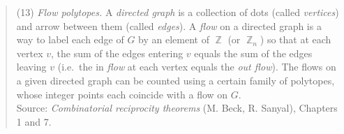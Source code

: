 \documentclass{amsart}
\DeclareMathOperator{\Z}{\mathbb{Z}}
\theoremstyle{plain}
\theoremstyle{remark}
\theoremstyle{definition}
\begin{document}
%
%
%

\noindent
\begin{quote}
  (13) \emph{Flow polytopes.}
  A \emph{directed graph} is a collection of dots (called \emph{vertices}) and
  arrow between them (called \emph{edges}). A \emph{flow} on a directed graph is a
  way to label each edge of $G$ by an element of $\Z$ (or $\Z_n$) so that at each
  vertex $v$, the sum of the edges entering $v$ equals the sum of the edges
  leaving $v$ (i.e.\ the in \emph{flow} at each vertex equals the \emph{out
  flow}). The flows on a given directed graph can be counted using a certain
  family of polytopes, whose integer points each coincide with a flow on $G$.
  \\[1em]
  \noindent
  Source:
  \emph{Combinatorial reciprocity theorems} (M. Beck, R. Sanyal), Chapters 1 and 7.
\end{quote}

\hrulefill

\end{document}
